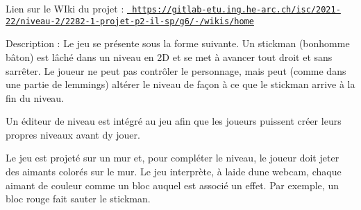 \label{index_md_C__git_with_Fork_Leakman_README}%
%
Lien sur le WIki du projet \+: \href{https://gitlab-etu.ing.he-arc.ch/isc/2021-22/niveau-2/2282-1-projet-p2-il-sp/g6/-/wikis/home}{\texttt{ https\+://gitlab-\/etu.\+ing.\+he-\/arc.\+ch/isc/2021-\/22/niveau-\/2/2282-\/1-\/projet-\/p2-\/il-\/sp/g6/-\//wikis/home}}

Description \+: Le jeu se présente sous la forme suivante. Un stickman (bonhomme bâton) est lâché dans un niveau en 2D et se met à avancer tout droit et sans s\textquotesingle{}arrêter. Le joueur ne peut pas contrôler le personnage, mais peut (comme dans une partie de lemmings) altérer le niveau de façon à ce que le stickman arrive à la fin du niveau.

Un éditeur de niveau est intégré au jeu afin que les joueurs puissent créer leurs propres niveaux avant d\textquotesingle{}y jouer.

Le jeu est projeté sur un mur et, pour compléter le niveau, le joueur doit jeter des aimants colorés sur le mur. Le jeu interprète, à l\textquotesingle{}aide d\textquotesingle{}une webcam, chaque aimant de couleur comme un bloc auquel est associé un effet. Par exemple, un bloc rouge fait sauter le stickman. 
